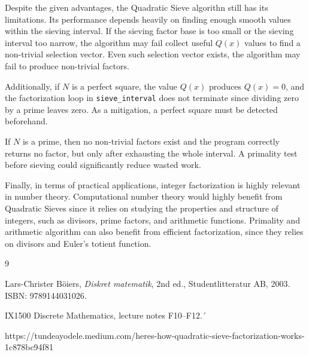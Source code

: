 \documentclass[11pt,a4paper]{article}
\begin{document}
Despite the given advantages, the Quadratic Sieve algorithn still has its limitations. Its performance depends heavily on finding enough smooth values within the sieving interval. If the sieving factor base is too small or the sieving interval too narrow, the algorithm may fail collect useful $Q(x)$ values to find a non-trivial selection vector. Even such selection vector exists, the algorithm may fail to produce non-trivial factors.

Additionally, if $N$ is a perfect square, the value $Q(x)$ produces $Q(x)=0$, and the factorization loop in \texttt{sieve\_interval} does not terminate since dividing zero by a prime leaves zero. As a mitigation, a perfect square must be detected beforehand.

If $N$ is a prime, then no non-trivial factors exist and the program correctly returns no factor, but only after exhausting the whole interval. A primality test before sieving could significantly reduce wasted work.

Finally, in terms of practical applications, integer factorization is highly relevant in number theory. Computational number theory would highly benefit from Quadratic Sieves since it relies on studying the properties and structure of integers, such as divisors, prime factors, and arithmetic functions. Primality and arithmetic algorithm can also benefit from efficient factorization, since they relies on divisors and Euler's totient function.

\begin{thebibliography}{9}

Lars-Christer Böiers,
\textit{Diskret matematik},
2nd ed.,
Studentlitteratur AB, 2003.
ISBN: 9789144031026.

IX1500 Discrete Mathematics, lecture notes F10--F12.´

https://tundeayodele.medium.com/heres-how-quadratic-sieve-factorization-works-1c878bc94f81

\end{thebibliography}
\end{document}
